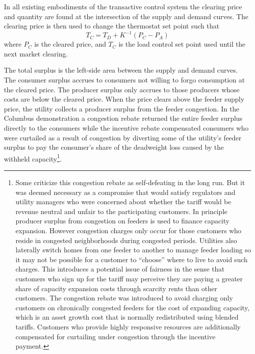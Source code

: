 In all existing embodiments of the transactive control system the clearing price and quantity are found at the intersection of the supply and demand curves. The clearing price is then used to change the thermostat set point such that
\begin{equation}
	T_C = T_D + K^{-1} (P_C - P_A)
\end{equation}
where $P_C$ is the cleared price, and $T_C$ is the load control set point used until the next market clearing.

The total surplus is the left-side area between the supply and demand curves. The consumer surplus accrues to consumers not willing to forgo consumption at the cleared price. The producer surplus only accrues to those producers whose costs are below the cleared price.  When the price clears above the feeder supply price, the utility collects a producer surplus from the feeder congestion. In the Columbus demonstration a congestion rebate returned the entire feeder surplus directly to the consumers while the incentive rebate compensated consumers who were curtailed as a result of congestion by diverting some of the utility's feeder surplus to pay the consumer's share of the deadweight loss caused by the withheld capacity\footnote{Some criticize this congestion rebate as self-defeating in the long run. But it was deemed necessary as a compromise that would satisfy regulators and utility managers who were concerned about whether the tariff would be revenue neutral and unfair to the participating customers. In principle producer surplus from congestion on feeders is used to finance capacity expansion. However congestion charges only occur for those customers who reside in congested neighborhoods during congested periods.  Utilities also laterally switch homes from one feeder to another to manage feeder loading so it may not be possible for a customer to ``choose'' where to live to avoid such charges.  This introduces a potential issue of fairness in the sense that customers who sign up for the tariff may perceive they are paying a greater share of capacity expansion costs through scarcity rents than other customers. The congestion rebate was introduced to avoid charging only customers on chronically congested feeders for the cost of expanding capacity, which is an asset growth cost that is normally redistributed using blended tariffs.  Customers who provide highly responsive resources are additionally compensated for curtailing under congestion through the incentive payment.}.

